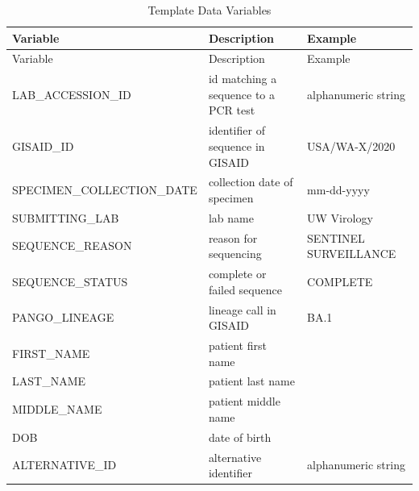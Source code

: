 \documentclass[
]{agujournal2019}
\begin{document}
\begin{longtable}[]{@{}
  >{\raggedright\arraybackslash}p{}
  >{\raggedright\arraybackslash}p{}
  >{\raggedright\arraybackslash}p{}@{}}
\caption{Template Data Variables}\label{tbl-template}\tabularnewline
\toprule\noalign{}
\begin{minipage}[b]{\linewidth}\raggedright
Variable
\end{minipage} & \begin{minipage}[b]{\linewidth}\raggedright
Description
\end{minipage} & \begin{minipage}[b]{\linewidth}\raggedright
Example
\end{minipage} \\
\midrule\noalign{}
\endfirsthead
\toprule\noalign{}
\begin{minipage}[b]{\linewidth}\raggedright
Variable
\end{minipage} & \begin{minipage}[b]{\linewidth}\raggedright
Description
\end{minipage} & \begin{minipage}[b]{\linewidth}\raggedright
Example
\end{minipage} \\
\midrule\noalign{}
\endhead
\bottomrule\noalign{}
\endlastfoot
LAB\_ACCESSION\_ID & id matching a sequence to a PCR test & alphanumeric
string \\
GISAID\_ID & identifier of sequence in GISAID & USA/WA-X/2020 \\
SPECIMEN\_COLLECTION\_DATE & collection date of specimen & mm-dd-yyyy \\
SUBMITTING\_LAB & lab name & UW Virology \\
SEQUENCE\_REASON & reason for sequencing & SENTINEL SURVEILLANCE \\
SEQUENCE\_STATUS & complete or failed sequence & COMPLETE \\
PANGO\_LINEAGE & lineage call in GISAID & BA.1 \\
FIRST\_NAME & patient first name & \\
LAST\_NAME & patient last name & \\
MIDDLE\_NAME & patient middle name & \\
DOB & date of birth & \\
ALTERNATIVE\_ID & alternative identifier & alphanumeric string \\
\end{longtable}
\end{document}

